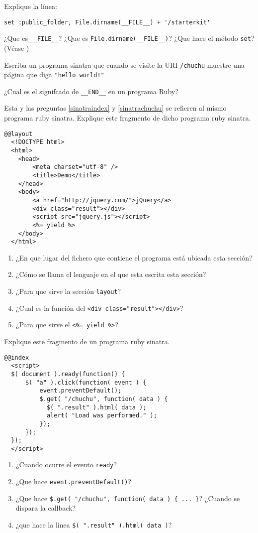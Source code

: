 Explique la línea:
\begin{verbatim}
set :public_folder, File.dirname(__FILE__) + '/starterkit'
\end{verbatim}
¿Que es \verb|__FILE__|? ¿Que es \verb|File.dirname(__FILE__)|?
¿Que hace el método \verb|set|? (Véase 
)
\item Escriba un programa sinatra que cuando se visite la URI \verb|/chuchu| muestre
una página que diga \verb|"hello world!"|
\item
¿Cual es el signifcado de \verb|__END__| en un programa Ruby?
\item  
\label{sinatalayout}
Esta y las preguntas 
\ref{sinatraindex} y
\ref{sinatrachuchu} se refieren al mismo programa ruby sinatra.
Explique este fragmento de dicho programa ruby sinatra. 
\begin{verbatim}
@@layout
  <!DOCTYPE html>
  <html>
    <head>
        <meta charset="utf-8" />
        <title>Demo</title>
    </head>
    <body>
        <a href="http://jquery.com/">jQuery</a>
        <div class="result"></div>
        <script src="jquery.js"></script>
        <%= yield %>
    </body>
  </html>
\end{verbatim}
\begin{enumerate}
\item ¿En que lugar del fichero que contiene el programa está ubicada esta sección? 
\item ¿Cómo se llama el lenguaje en el que esta escrita esta sección?
\item ¿Para que sirve la sección \verb|layout|?
\item ¿Cual es la función del \verb|<div class="result"></div>|?
\item ¿Para que sirve el \verb|<%= yield %>|?
\end{enumerate}
\item 
\label{sinatraindex}
Explique este fragmento de un programa ruby sinatra.
\begin{verbatim}
@@index
  <script>
  $( document ).ready(function() {
      $( "a" ).click(function( event ) {
          event.preventDefault();
          $.get( "/chuchu", function( data ) {
            $( ".result" ).html( data );
            alert( "Load was performed." );
          });
      });
  });
  </script>
\end{verbatim}
\begin{enumerate}
\item ¿Cuando ocurre el evento \verb|ready|?
\item ¿Que hace \verb|event.preventDefault()|?
\item ¿Que hace \verb|$.get( "/chuchu", function( data ) { ... }|?
¿Cuando se dispara la callback?
\item ¿que hace la línea \verb|$( ".result" ).html( data )|?
\end{enumerate}

